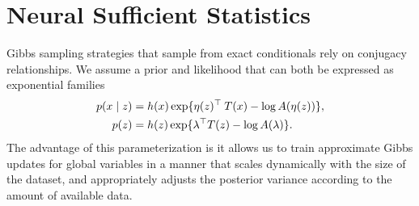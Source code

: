 \documentclass{article}
\theoremstyle{definition}
\begin{document}
\section{Neural Sufficient Statistics}
Gibbs sampling strategies that sample from exact conditionals rely on conjugacy relationships. We assume a prior and likelihood that can both be expressed as exponential families
\begin{align*}
    p(x \mid z) 
    &= 
    h(x) \exp \{ 
        \eta(z)^\top \: T(x)  
        -\log A(\eta(z)) \}, 
    \\
    p(z ) 
    &= 
    h(z) \exp \{ 
        \lambda^\top T(z) 
        - \log A(\lambda) \}.
\end{align*}
The advantage of this parameterization is it allows us to train approximate Gibbs updates for global variables in a manner that scales dynamically with the size of the dataset, and appropriately adjusts the posterior variance according to the amount of available data.
\end{document}
